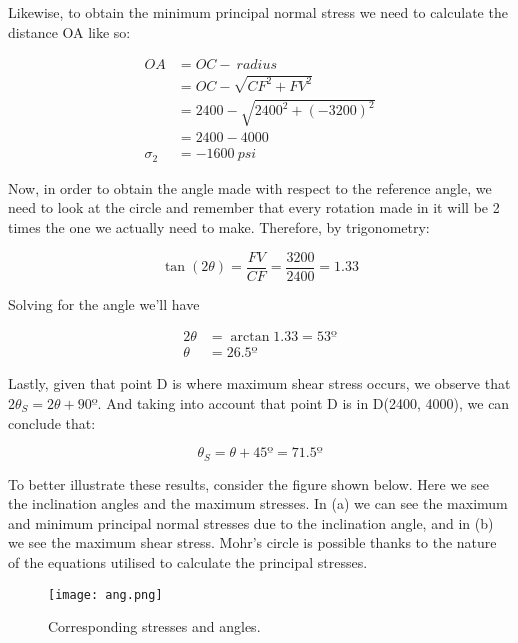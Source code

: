\documentclass[12pt, letterpaper]{article}
\begin{document}
Likewise, to obtain the minimum principal normal stress we need to calculate the distance OA like so:

\begin{equation}
	\begin{split}
		OA &= OC -\ radius\\
		&= OC - \sqrt{CF^2 + FV^2}\\
		&= 2400 - \sqrt{2400^2 + (-3200)^2}\\
		&= 2400 - 4000\\
		\sigma_2 &= -1600\ psi
	\end{split}
\end{equation}

Now, in order to obtain the angle made with respect to the reference angle, we need to look at the circle and remember that every rotation made in it will be 2 times the one we actually need to make. Therefore, by trigonometry:

\begin{equation}
	\tan(2\theta) = \frac{FV}{CF} = \frac{3200}{2400} = 1.33
\end{equation}

Solving for the angle we'll have

\begin{equation}
	\begin{split}
		2\theta &= \arctan 1.33 = 53º\\
		\theta &= 26.5º
	\end{split}
\end{equation}

Lastly, given that point D is where maximum shear stress occurs, we observe that $2\theta_S = 2\theta + 90º$. And taking into account that point D is in D(2400, 4000), we can conclude that:

\begin{equation}
	\theta_S = \theta + 45º = 71.5º
\end{equation}

To better illustrate these results, consider the figure shown below. Here we see the inclination angles and the maximum stresses. In (a) we can see the maximum and minimum principal normal stresses due to the inclination angle, and in (b) we see the maximum shear stress. Mohr's circle is possible thanks to the nature of the equations utilised to calculate the principal stresses.\supercite{fitz82}

\begin{figure}
	\centering
	\texttt{[image: ang.png]}
	\caption{Corresponding stresses and angles.}
\end{figure}
\renewcommand\refname{References}
\printbibliography
\end{document}
